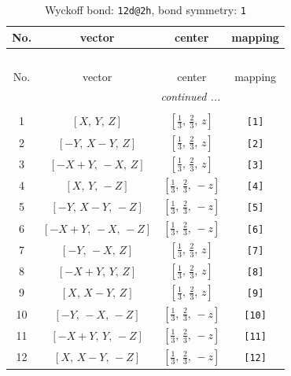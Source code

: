 \documentclass[fleqn,8pt]{jsarticle}
\begin{document}
\begin{longtable}{cccc}
\caption{Wyckoff bond: {\tt 12d@2h}, bond symmetry: {\tt 1}}
 \\
 \hline \hline
No. & vector & center & mapping \\ \hline \endfirsthead

\multicolumn{3}{l}{\tablename\ \thetable{}} \\
 \hline \hline
No. & vector & center & mapping \\ \hline \endhead

 \hline \hline
\multicolumn{3}{r}{\footnotesize\it continued ...} \\ \endfoot

 \hline \hline
\multicolumn{3}{r}{} \\ \endlastfoot

1 & $\left[ X,\, Y,\, Z \right]$ & $\left[ \frac{1}{3},\, \frac{2}{3},\, z \right]$ & {\tt [1]} \\ \hline
2 & $\left[ - Y,\, X - Y,\, Z \right]$ & $\left[ \frac{1}{3},\, \frac{2}{3},\, z \right]$ & {\tt [2]} \\ \hline
3 & $\left[ - X + Y,\, - X,\, Z \right]$ & $\left[ \frac{1}{3},\, \frac{2}{3},\, z \right]$ & {\tt [3]} \\ \hline
4 & $\left[ X,\, Y,\, - Z \right]$ & $\left[ \frac{1}{3},\, \frac{2}{3},\, - z \right]$ & {\tt [4]} \\ \hline
5 & $\left[ - Y,\, X - Y,\, - Z \right]$ & $\left[ \frac{1}{3},\, \frac{2}{3},\, - z \right]$ & {\tt [5]} \\ \hline
6 & $\left[ - X + Y,\, - X,\, - Z \right]$ & $\left[ \frac{1}{3},\, \frac{2}{3},\, - z \right]$ & {\tt [6]} \\ \hline
7 & $\left[ - Y,\, - X,\, Z \right]$ & $\left[ \frac{1}{3},\, \frac{2}{3},\, z \right]$ & {\tt [7]} \\ \hline
8 & $\left[ - X + Y,\, Y,\, Z \right]$ & $\left[ \frac{1}{3},\, \frac{2}{3},\, z \right]$ & {\tt [8]} \\ \hline
9 & $\left[ X,\, X - Y,\, Z \right]$ & $\left[ \frac{1}{3},\, \frac{2}{3},\, z \right]$ & {\tt [9]} \\ \hline
10 & $\left[ - Y,\, - X,\, - Z \right]$ & $\left[ \frac{1}{3},\, \frac{2}{3},\, - z \right]$ & {\tt [10]} \\ \hline
11 & $\left[ - X + Y,\, Y,\, - Z \right]$ & $\left[ \frac{1}{3},\, \frac{2}{3},\, - z \right]$ & {\tt [11]} \\ \hline
12 & $\left[ X,\, X - Y,\, - Z \right]$ & $\left[ \frac{1}{3},\, \frac{2}{3},\, - z \right]$ & {\tt [12]} \\
\end{longtable}
\end{document}
